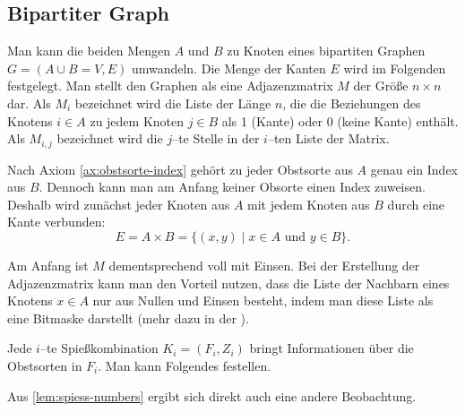 \subsection{Bipartiter Graph}
Man kann die beiden Mengen $A$ und $B$ zu Knoten eines bipartiten Graphen $G = (A \cup B = V, E)$ umwandeln.
Die Menge der Kanten $E$ wird im Folgenden festgelegt.
Man stellt den Graphen als eine Adjazenzmatrix $M$ der Größe $n \times n$ dar. 
Als $M_i$ bezeichnet wird die Liste der Länge $n$,
die die Beziehungen des Knotens
$i \in A$ zu jedem Knoten $j \in B$ als 1 (Kante) oder 0 (keine Kante) enthält.
Als $M_{i, j}$ bezeichnet wird die $j$--te Stelle in der $i$--ten Liste der Matrix.

Nach Axiom \ref{ax:obstsorte-index} gehört zu jeder Obstsorte aus $A$ genau ein Index aus $B$.
Dennoch kann man am Anfang keiner Obsorte einen Index zuweisen.
Deshalb wird zunächst jeder Knoten aus $A$ mit jedem Knoten aus $B$ durch eine Kante verbunden:
\[
E = A\times B = \{(x, y) \mid  x \in A \text{ und } y \in B\}.
\]



Am Anfang ist $M$ dementsprechend voll mit Einsen.
Bei der Erstellung der Adjazenzmatrix kann man den Vorteil nutzen, dass die 
Liste der Nachbarn eines Knotens $x \in A$ nur aus Nullen und Einsen besteht, indem man
diese Liste als eine Bitmaske darstellt (mehr dazu in der ).

Jede $i$--te Spießkombination $K_i = (F_i, Z_i)$ bringt Informationen über die Obstsorten in $F_i$.
Man kann Folgendes festellen. 






\noindent Aus \cref{lem:spiess-numbers} ergibt sich direkt auch eine andere Beobachtung.




